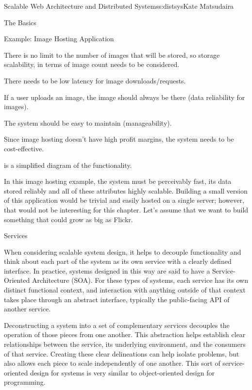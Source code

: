 \begin{aosachapter}{Scalable Web Architecture and Distributed Systems}{s:distsys}{Kate Matsudaira}
\begin{aosasect1}{The Basics}
\begin{aosasect2}{Example: Image Hosting Application}
\begin{aosaitemize}

\item There is no limit to the number of images that will be
  stored, so storage scalability, in terms of image count needs to be
  considered.

\item There needs to be low latency for image downloads/requests.

\item If a user uploads an image, the image should always be there
  (data reliability for images).

\item The system should be easy to maintain (manageability).

\item Since image hosting doesn't have high profit margins, the system
  needs to be cost-effective.

\end{aosaitemize}

 is a simplified diagram of the functionality.


In this image hosting example, the system must be perceivably fast,
its data stored reliably and all of these attributes highly
scalable. Building a small version of this application would be
trivial and easily hosted on a single server; however, that would not be
interesting for this chapter. Let's assume that we want to build
something that could grow as big as Flickr.

\end{aosasect2}

\begin{aosasect2}{Services}

When considering scalable system design, it helps to decouple
functionality and think about each part of the system as its own
service with a clearly defined interface. In practice, systems
designed in this way are said to have a Service-Oriented Architecture
(SOA). For these types of systems, each service has its own distinct
functional context, and interaction with anything outside of that
context takes place through an abstract interface, typically the
public-facing API of another service.

Deconstructing a system into a set of complementary services decouples
the operation of those pieces from one another. This abstraction helps
establish clear relationships between the service, its underlying
environment, and the consumers of that service. Creating these
clear delineations can help isolate problems, but also allows each
piece to scale independently of one another. This sort of
service-oriented design for systems is very similar to object-oriented
design for programming.


\end{aosasect2}
\end{aosasect1}
\end{aosachapter}
